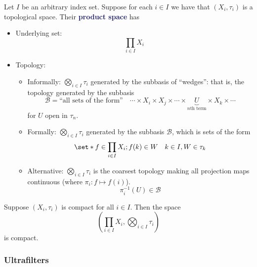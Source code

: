 \documentclass[11pt]{article}
\numberwithin{equation}{section}
\newcommand{\navy}[1]{\textcolor{MidnightBlue}{\bf #1}}
\newcounter{theo}[section]\setcounter{theo}{0}
\theoremstyle{definition}
\theoremstyle{definition}
\newcommand\parens[1]{\left( #1 \right)}
\def\Set{\set*}%
\newcommand{\1}{\mathbbm 1}
\def\t{\tau}
\newcommand{\bB}{\mathcal B}
\begin{document}
\begin{definition}
	Let $I$ be an arbitrary index set. Suppose for each $i \in I$ we have that $(X_i, \t_i)$ is a topological space. Their \navy{product space} has
	\begin{itemize}
		\item Underlying set:
		\begin{equation}
			\prod_{i \in I} X_i
		\end{equation}
		\item Topology: 
		\begin{itemize}
			\item Informally: $\bigotimes_{i \in I} \t_i$ generated by the subbasis of ``wedges'': that is, the topology generated by the subbasis
			\begin{equation}
				\bB = \text{``all sets of the form''} \quad \cdots \times X_i \times X_j \times \cdots \times \underbrace{U}_{n \text{th term}} \times X_k \times \cdots  	
			\end{equation} 
			for $U$ open in $\t_n$.
			\item Formally: $\bigotimes_{i \in I} \t_i$ generated by the subbasis $\bB$, which is sets of the form 
			\begin{equation}
				\Set{f \in \prod_{i \in I} X_i; f(k) \in W} \quad k \in I, W \in \t_k
			\end{equation}
			\item Alternative: $\bigotimes_{i \in I} \t_i$ is the coarsest topology making all projection maps continuous (where $\pi_i: f \mapsto f(i)$).
			\begin{equation}
				\pi_i^{-1}(U) \in \bB
			\end{equation}
		\end{itemize}
	\end{itemize}
\end{definition}

\begin{theorem}
	Suppose $(X_i,\t_i)$ is compact for all $i \in I$. Then the space 
	\begin{equation}
		\parens{\prod_{i \in I} X_i, \bigotimes_{i \in I} \t_i}
	\end{equation}
	is compact. 
\end{theorem}

\subsubsection{Ultrafilters}
\end{document}
